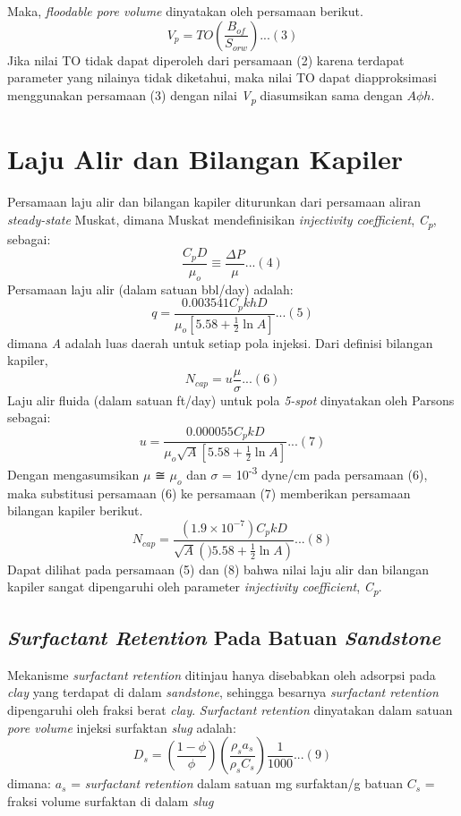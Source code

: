 \documentclass[
]{book}
\begin{document}
Maka, \emph{floodable pore volume} dinyatakan oleh persamaan berikut.
\[V_p = TO \left( \frac{B_{of}}{S_{orw}}\right)...(3)\]
Jika nilai TO tidak dapat diperoleh dari persamaan (2) karena terdapat parameter yang nilainya tidak diketahui, maka nilai TO dapat diapproksimasi menggunakan persamaan (3) dengan nilai \emph{V\textsubscript{p}} diasumsikan sama dengan \(A\phi h\).

\hypertarget{laju-alir-dan-bilangan-kapiler}{%
\section{Laju Alir dan Bilangan Kapiler}\label{laju-alir-dan-bilangan-kapiler}}

Persamaan laju alir dan bilangan kapiler diturunkan dari persamaan aliran \emph{steady-state} Muskat, dimana Muskat mendefinisikan \emph{injectivity coefficient}, \emph{C\textsubscript{p}}, sebagai:
\[\frac{C_pD}{\mu_o} \equiv \frac{\Delta P}{\mu}...(4) \]
Persamaan laju alir (dalam satuan bbl/day) adalah:
\[q = \frac{0.003541C_pkhD}{\mu_o \left[ 5.58+ \frac{1}{2}\ln A\right]}...(5)\]
dimana \emph{A} adalah luas daerah untuk setiap pola injeksi.
Dari definisi bilangan kapiler,
\[N_{cap}=u \frac{\mu}{\sigma}...(6)\]
Laju alir fluida (dalam satuan ft/day) untuk pola \emph{5-spot} dinyatakan oleh Parsons sebagai:
\[u = \frac{0.000055C_pkD}{\mu_o \sqrt A \left[ 5.58+ \frac{1}{2}\ln A\right]}...(7)\]
Dengan mengasumsikan \(\mu\) ≅ \(\mu_o\) dan \(\sigma\) = 10\textsuperscript{-3} dyne/cm pada persamaan (6), maka substitusi persamaan (6) ke persamaan (7) memberikan persamaan bilangan kapiler berikut.
\[N_{cap} = \frac{(1.9 \times 10^{-7})C_pkD}{\sqrt A \left() 5.58+ \frac{1}{2}\ln A\right)}...(8)\]
Dapat dilihat pada persamaan (5) dan (8) bahwa nilai laju alir dan bilangan kapiler sangat dipengaruhi oleh parameter \emph{injectivity coefficient}, \emph{C\textsubscript{p}}.

\hypertarget{surfactant-retention-pada-batuan-sandstone}{%
\subsection{\texorpdfstring{\emph{Surfactant Retention} Pada Batuan \emph{Sandstone}}{Surfactant Retention Pada Batuan Sandstone}}\label{surfactant-retention-pada-batuan-sandstone}}

Mekanisme \emph{surfactant retention} ditinjau hanya disebabkan oleh adsorpsi pada \emph{clay} yang terdapat di dalam \emph{sandstone}, sehingga besarnya \emph{surfactant retention} dipengaruhi oleh fraksi berat \emph{clay}. \emph{Surfactant retention} dinyatakan dalam satuan \emph{pore volume} injeksi surfaktan \emph{slug} adalah:
\[D_s = \left(\frac{1-\phi}{\phi} \right) \left( \frac{\rho_sa_s}{\rho_sC_s}\right)\frac {1}{1000}...(9)\]
dimana:
\(a_s\) = \emph{surfactant retention} dalam satuan mg surfaktan/g batuan
\(C_s\) = fraksi volume surfaktan di dalam \emph{slug}
\end{document}
